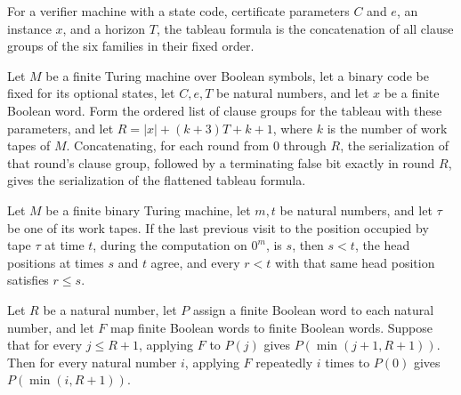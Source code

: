 \begin{definition}
\label{Complexity.clTableau}
\leanok
{}
For a verifier machine with a state code, certificate parameters $C$ and $e$, an instance $x$, and a horizon $T$, the tableau formula is the concatenation of all clause groups of the six families in their fixed order.
\end{definition}

\begin{lemma}
\label{Complexity.clTableau_chunks}
\leanok
{}
Let $M$ be a finite Turing machine over Boolean symbols, let a binary code be fixed for
its optional states, let $C,e,T$ be natural numbers, and let $x$ be a finite Boolean
word. Form the ordered list of clause groups for the tableau with these parameters, and
let $R=|x|+(k+3)T+k+1$, where $k$ is the number of work tapes of $M$. Concatenating, for
each round from $0$ through $R$, the serialization of that round's clause group,
followed by a terminating false bit exactly in round $R$, gives the serialization of the
flattened tableau formula.
\end{lemma}

\begin{lemma}
\label{Complexity.clPrev_spec}
\leanok
{}
Let $M$ be a finite binary Turing machine, let $m,t$ be natural numbers, and let $\tau$
be one of its work tapes. If the last previous visit to the position occupied by tape
$\tau$ at time $t$, during the computation on $0^m$, is $s$, then $s<t$, the head
positions at times $s$ and $t$ agree, and every $r<t$ with that same head position
satisfies $r\le s$.
\end{lemma}

\begin{lemma}
\label{Complexity.clCursor_orbit}
\leanok
{}
Let $R$ be a natural number, let $P$ assign a finite Boolean word to each natural
number, and let $F$ map finite Boolean words to finite Boolean words. Suppose that for
every $j\le R+1$, applying $F$ to $P(j)$ gives $P(\min(j+1,R+1))$. Then for every
natural number $i$, applying $F$ repeatedly $i$ times to $P(0)$ gives $P(\min(i,R+1))$.
\end{lemma}


